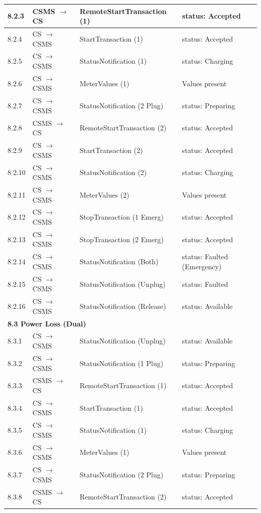 \documentclass[a4paper,11pt]{report}
\begin{document}
\begin{footnotesize}
\begin{longtable}{|p{1.2cm}|p{2.5cm}|p{5.5cm}|p{6cm}|}
\hline
8.2.3 & CSMS $\to$ CS & RemoteStartTransaction (1) & status: Accepted \\
\hline
8.2.4 & CS $\to$ CSMS & StartTransaction (1) & status: Accepted \\
\hline
8.2.5 & CS $\to$ CSMS & StatusNotification (1) & status: Charging \\
\hline
8.2.6 & CS $\to$ CSMS & MeterValues (1) & Values present \\
\hline
8.2.7 & CS $\to$ CSMS & StatusNotification (2 Plug) & status: Preparing \\
\hline
8.2.8 & CSMS $\to$ CS & RemoteStartTransaction (2) & status: Accepted \\
\hline
8.2.9 & CS $\to$ CSMS & StartTransaction (2) & status: Accepted \\
\hline
8.2.10 & CS $\to$ CSMS & StatusNotification (2) & status: Charging \\
\hline
8.2.11 & CS $\to$ CSMS & MeterValues (2) & Values present \\
\hline
8.2.12 & CS $\to$ CSMS & StopTransaction (1 Emerg) & status: Accepted \\
\hline
8.2.13 & CS $\to$ CSMS & StopTransaction (2 Emerg) & status: Accepted \\
\hline
8.2.14 & CS $\to$ CSMS & StatusNotification (Both) & status: Faulted (Emergency) \\
\hline
8.2.15 & CS $\to$ CSMS & StatusNotification (Unplug) & status: Faulted \\
\hline
8.2.16 & CS $\to$ CSMS & StatusNotification (Release) & status: Available \\
\hline
\multicolumn{4}{|l|}{\textbf{8.3 Power Loss (Dual)}} \\
\hline
8.3.1 & CS $\to$ CSMS & StatusNotification (Unplug) & status: Available \\
\hline
8.3.2 & CS $\to$ CSMS & StatusNotification (1 Plug) & status: Preparing \\
\hline
8.3.3 & CSMS $\to$ CS & RemoteStartTransaction (1) & status: Accepted \\
\hline
8.3.4 & CS $\to$ CSMS & StartTransaction (1) & status: Accepted \\
\hline
8.3.5 & CS $\to$ CSMS & StatusNotification (1) & status: Charging \\
\hline
8.3.6 & CS $\to$ CSMS & MeterValues (1) & Values present \\
\hline
8.3.7 & CS $\to$ CSMS & StatusNotification (2 Plug) & status: Preparing \\
\hline
8.3.8 & CSMS $\to$ CS & RemoteStartTransaction (2) & status: Accepted \\

\end{longtable}
\end{footnotesize}
\end{document}
